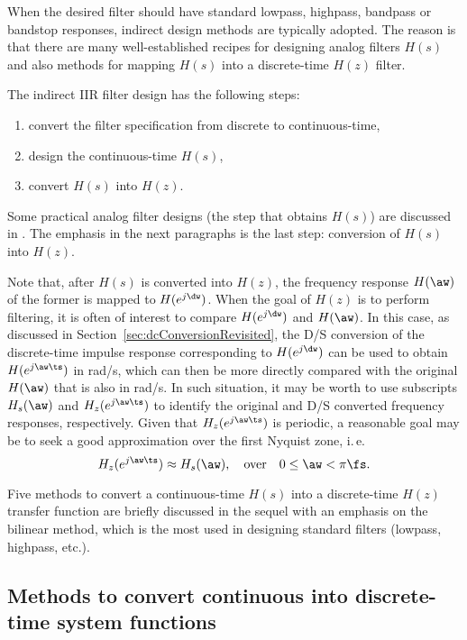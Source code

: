 When the desired filter should have standard lowpass, highpass, bandpass or bandstop responses, indirect design methods are typically adopted. The reason is that there are many well-established recipes for designing analog filters $H(s)$ and also methods for mapping $H(s)$ into a discrete-time $H(z)$ filter. 

The indirect IIR filter design has the following steps:
\begin{enumerate}
	\item convert the filter specification from discrete to continuous-time,
	\item design the continuous-time $H(s)$,
	\item convert $H(s)$ into $H(z)$.
\end{enumerate}

Some practical analog filter designs (the step that obtains $H(s)$) are discussed in
. The emphasis in the next paragraphs is the last step: conversion of $H(s)$ into $H(z)$.

Note that, after $H(s)$ is converted into $H(z)$, the frequency response $H(\aw)$ of the former
is mapped to $H(e^{j \dw})$. When the goal of $H(z)$ is to perform filtering, it is often of  interest to compare $H(e^{j \dw})$ and $H(\aw)$. In this case, as 
discussed in Section~\ref{sec:dcConversionRevisited}, the D/S conversion of the discrete-time
impulse response corresponding to $H(e^{j \dw})$ can be used to obtain $H(e^{j \aw \ts})$ in rad/s, 
which can then be more directly compared with the original $H(\aw)$ that is also in rad/s.
In such situation, it may be worth to use subscripts $H_s(\aw)$ and $H_z(e^{j \aw \ts})$ to 
identify the original and D/S converted frequency responses, respectively. Given that 
$H_z(e^{j \aw \ts})$ is periodic, a reasonable goal may be to seek a good approximation
over the first Nyquist zone, i.\,e.
\begin{equation}
H_z(e^{j \aw \ts}) \approx H_s(\aw), \textrm{~~~over~~~} 0 \le \aw < \pi \fs.
\label{eq:goalOfConversions}
\end{equation}

Five methods to convert a continuous-time $H(s)$ into a discrete-time $H(z)$ transfer function are
briefly discussed in the sequel with an emphasis on the bilinear method, which is the most
used in designing standard filters (lowpass, highpass, etc.). 

\subsection{Methods to convert continuous into discrete-time system functions}
\label{sec:HsIntoHz}

